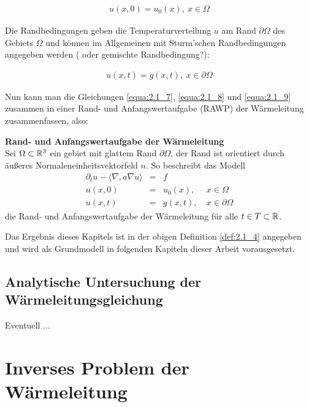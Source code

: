 \begin{eqnarray}
	u(x,0) = u_0(x), \ x \in \Omega
	\label{equa:2.1_8}
\end{eqnarray}

Die Randbedingungen geben die Temperaturverteilung $u$ am Rand $\partial \Omega$ des Gebiets $\Omega$ und können im Allgemeinen mit Sturm'schen Randbedingungen angegeben werden ({\color{red} oder gemischte Randbedingung?}):

\begin{eqnarray}
	u(x,t) = g(x, t), \ x \in \partial \Omega 
	\label{equa:2.1_9}
\end{eqnarray}   

Nun kann man die Gleichungen \ref{equa:2.1_7}, \ref{equa:2.1_8} und \ref{equa:2.1_9} zusammen in einer Rand- und Anfangswertaufgabe (RAWP) der Wärmeleitung zusammenfassen, also:

\begin{Definition}
	\textbf{Rand- und Anfangswertaufgabe der Wärmeleitung} \\
	Sei $\Omega \subset	\mathbb{R}^3$ ein gebiet mit glattem Rand $\partial \Omega$, der Rand ist orientiert durch äußeres Normaleneinheitsvektorfeld $n$. So beschreibt das Modell
	\begin{equation}
		\begin{array}{llll}
			\partial_t u - \langle \nabla, a\nabla u \rangle & = & f & \\
			u(x,0) & = & u_0(x), & \ x \in \Omega \\
				u(x,t) & = & g(x, t), & \ x \in \partial \Omega
		\end{array}
		\label{equa:2.1_10}
	\end{equation}
	die Rand- und Anfangswertaufgabe der Wärmeleitung für alle $t \in T \subset \mathbb{R}$. 
	\label{def:2.1_4}
\end{Definition}

Das Ergebnis dieses Kapitels ist in der obigen Definition \ref{def:2.1_4} angegeben und wird als Grundmodell in folgenden Kapiteln dieser Arbeit vorausgesetzt.  

\subsection{Analytische Untersuchung der Wärmeleitungsgleichung}

Eventuell ...

\section{Inverses Problem der Wärmeleitung}

